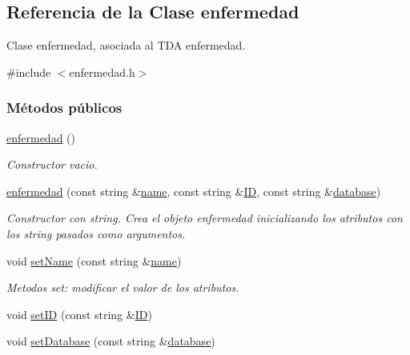 \hypertarget{classenfermedad}{\subsection{Referencia de la Clase enfermedad}
\label{classenfermedad}
}


Clase enfermedad, asociada al T\-D\-A enfermedad.  




{\ttfamily \#include $<$enfermedad.\-h$>$}

\subsubsection*{Métodos públicos}
\begin{DoxyCompactItemize}
\item 
\hyperlink{classenfermedad_a60eb5e620b0bf9a53d4f0980031aeefd}{enfermedad} ()
\begin{DoxyCompactList}\small\item\em Constructor vacio. \end{DoxyCompactList}\item 
\hyperlink{classenfermedad_a7caef55b00a31ce18191ceaba81ed20c}{enfermedad} (const string \&\hyperlink{classenfermedad_ad7c4204057028a73bde6022678c6813e}{name}, const string \&\hyperlink{classenfermedad_a689cdbd469ecc28e045bda2f62a229d2}{I\-D}, const string \&\hyperlink{classenfermedad_a3684b7ec850d4c9357dd21bdd5e02803}{database})
\begin{DoxyCompactList}\small\item\em Constructor con string. Crea el objeto enfermedad inicializando los atributos con los string pasados como argumentos. \end{DoxyCompactList}\item 
void \hyperlink{classenfermedad_a18f621d13de01c0b06a05757ddd8a087}{set\-Name} (const string \&\hyperlink{classenfermedad_ad7c4204057028a73bde6022678c6813e}{name})
\begin{DoxyCompactList}\small\item\em Metodos set\-: modificar el valor de los atributos. \end{DoxyCompactList}\item 
void \hyperlink{classenfermedad_a5ad52bdce8de9ac4fe25b460dc699af4}{set\-I\-D} (const string \&\hyperlink{classenfermedad_a689cdbd469ecc28e045bda2f62a229d2}{I\-D})
\item 
void \hyperlink{classenfermedad_ac1f009307d52232420a72264e9c2ce3f}{set\-Database} (const string \&\hyperlink{classenfermedad_a3684b7ec850d4c9357dd21bdd5e02803}{database})

\end{DoxyCompactItemize}
